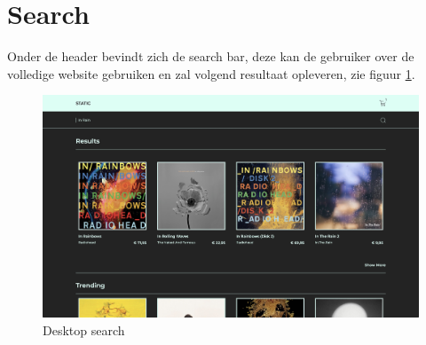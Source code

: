 \section{Search}

Onder de header bevindt zich de search bar, deze kan de gebruiker over de volledige website gebruiken en zal volgend resultaat opleveren, zie figuur \ref{fig:desktopSearch}.

\begin{figure}
	\centering
	\includegraphics[width=1\linewidth]{graphics/desktopSearch}
	\caption[Desktop search]{Desktop search}
	\label{fig:desktopSearch}
\end{figure}
